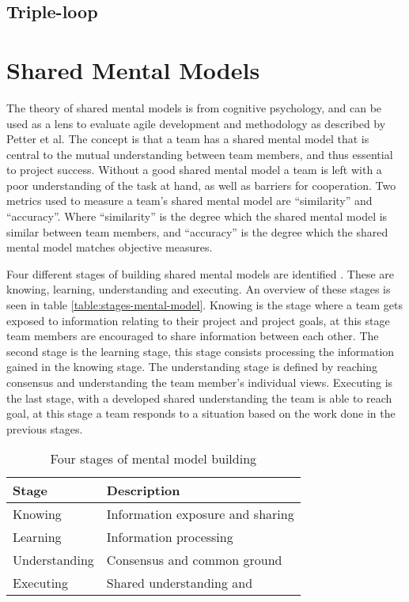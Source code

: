 \subsection{Triple-loop} %
\label{sub:triple_loop}

\section{Shared Mental Models}

The theory of shared mental models is from cognitive psychology, and can be used as a lens to evaluate agile development and methodology as described by Petter et al\cite{Petter2013}. The concept is that a team has a shared mental model that is central to the mutual understanding between team members, and thus essential to project success. Without a good shared mental model a team is left with a poor understanding of the task at hand, as well as barriers for cooperation. Two metrics used to measure a team's shared mental model are ``similarity'' and ``accuracy''. Where ``similarity'' is the degree which the shared mental model is similar between team members, and ``accuracy'' is the degree which the shared mental model matches objective measures. 

Four different stages of building shared mental models are identified \cite{Petter2013}. These are knowing, learning, understanding and executing. An overview of these stages is seen in table \autoref{table:stages-mental-model}. Knowing is the stage where a team gets exposed to information relating to their project and project goals, at this stage team members are encouraged to share information between each other. The second stage is the learning stage, this stage consists processing the information gained in the knowing stage. The understanding stage is defined by reaching consensus and understanding the team member's individual views. Executing is the last stage, with a developed shared understanding the team is able to reach goal, at this stage a team responds to a situation based on the work done in the previous stages.

\begin{table}[!h]
	\begin{centering}
	\caption{Four stages of mental model building}
	\label{table:stages-mental-model}
	\begin{tabular}{l | p{}}

	\hline
	Stage & Description \\
	\hline
	Knowing &  Information exposure and sharing\\
	Learning & Information processing \\
	Understanding & Consensus and common ground \\
	Executing & Shared understanding and  \\
	\hline
	
	
\end{tabular}
\end{centering}
\end{table}

	



\clearpage

